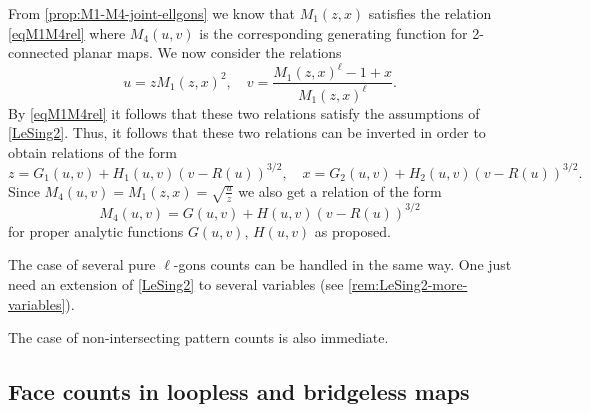 \documentclass[a4paper,UKenglish,cleveref, autoref, thm-restate]{lipics-v2021}
\renewcommand{\(}{\left(}
\renewcommand{\)}{\right)}
\newcommand{\ellgon}{pure \texorpdfstring{$\ell$}{ell}-gon}
\newcommand{\ellgons}{\ellgon s}
\begin{document}
From \cref{prop:M1-M4-joint-ellgons} we know that ${M_1}(z,x)$ satisfies the relation \cref{eqM1M4rel}
where ${M_4}(u,v)$ is the corresponding generating function for
2-connected planar maps. We now consider the relations
\[
    u = z{M_1}(z,x)^2, \quad
    v = \frac{{M_1}(z,x)^\ell-1 + x}{{M_1}(z,x)^\ell}.
\]
By \cref{eqM1M4rel} it follows that these two relations satisfy the
assumptions of \cref{LeSing2}. Thus, it follows that these two
relations can be inverted in order to obtain relations of the form
\[
      z = G_1(u,v) + H_1(u,v) (v-R(u))^{3/2}, \quad
      x = G_2(u,v) + H_2(u,v) (v-R(u))^{3/2}.
\]
Since ${M_4}(u,v) = {M_1}(z,x) = \sqrt{ \frac uz}$
we also get a relation of the form
\[
{M_4}(u,v) = G(u,v) + H(u,v) (v-R(u))^{3/2}
\]
for proper analytic functions $G(u,v)$, $H(u,v)$ as proposed.

The case of several \ellgons{} counts can be handled in
the same way. One just need an extension of \cref{LeSing2} to
several variables (see \cref{rem:LeSing2-more-variables}).

The case of non-intersecting pattern counts is also immediate.

\subsection{Face counts in loopless and  bridgeless maps}
\end{document}
